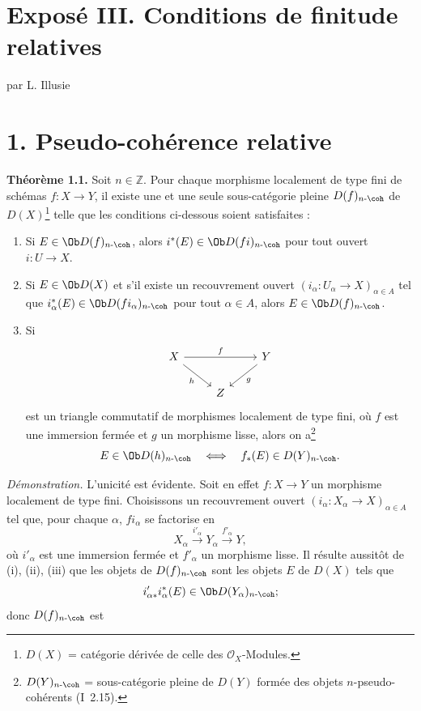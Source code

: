 \section*{Exposé III. Conditions de finitude relatives}
\begin{center}
par L. Illusie
\end{center}

\section*{1. Pseudo-cohérence relative}

\textbf{Théorème 1.1.} Soit \(n\in\mathbb Z\). Pour chaque morphisme localement de type fini de schémas \(f:X\longrightarrow Y\), il existe une et une seule sous-catégorie pleine \(D(f)_{n\text{-}\coh}\) de \(D(X)\)\footnote{\(D(X)\) = catégorie dérivée de celle des \(\mathcal O_X\)-Modules.} telle que les conditions ci-dessous soient satisfaites :
\begin{enumerate}[label=(\roman*)]
\item Si \(E\in\Ob D(f)_{n\text{-}\coh}\), alors \(i^*(E)\in\Ob D(fi)_{n\text{-}\coh}\) pour tout ouvert \(i:U\to X\).

\item Si \(E\in\Ob D(X)\) et s'il existe un recouvrement ouvert \((i_\alpha:U_\alpha\to X)_{\alpha\in A}\) tel que \(i_\alpha^*(E)\in\Ob D(fi_\alpha)_{n\text{-}\coh}\) pour tout \(\alpha\in A\), alors \(E\in\Ob D(f)_{n\text{-}\coh}\).

\item Si
\[
\begin{tikzcd}
X \arrow[rr,"f"] \arrow[dr,"h"'] & & Y \arrow[dl,"g"]\\
& Z &
\end{tikzcd}
\]
est un triangle commutatif de morphismes localement de type fini, où \(f\) est une immersion fermée et \(g\) un morphisme lisse, alors on a\footnote{\(D(Y)_{n\text{-}\coh}\) = sous-catégorie pleine de \(D(Y)\) formée des objets \(n\)-pseudo-cohérents (I~2.15).}
\[
  E\in\Ob D(h)_{n\text{-}\coh}
  \quad\Longleftrightarrow\quad
  f_*(E)\in D(Y)_{n\text{-}\coh}.
\]
\end{enumerate}

\emph{Démonstration.} L'unicité est évidente. Soit en effet \(f:X\to Y\) un morphisme localement de type fini. Choisissons un recouvrement ouvert \((i_\alpha:X_\alpha\to X)_{\alpha\in A}\) tel que, pour chaque \(\alpha\), \(fi_\alpha\) se factorise en
\[
  X_\alpha\xrightarrow{i'_\alpha}Y_\alpha\xrightarrow{f'_\alpha}Y,
\]
où \(i'_\alpha\) est une immersion fermée et \(f'_\alpha\) un morphisme lisse. Il résulte aussitôt de (i), (ii), (iii) que les objets de \(D(f)_{n\text{-}\coh}\) sont les objets \(E\) de \(D(X)\) tels que
\[
  i'_{\alpha *}i_\alpha^*(E)\in \Ob D(Y_\alpha)_{n\text{-}\coh};
\]
donc \(D(f)_{n\text{-}\coh}\) est
